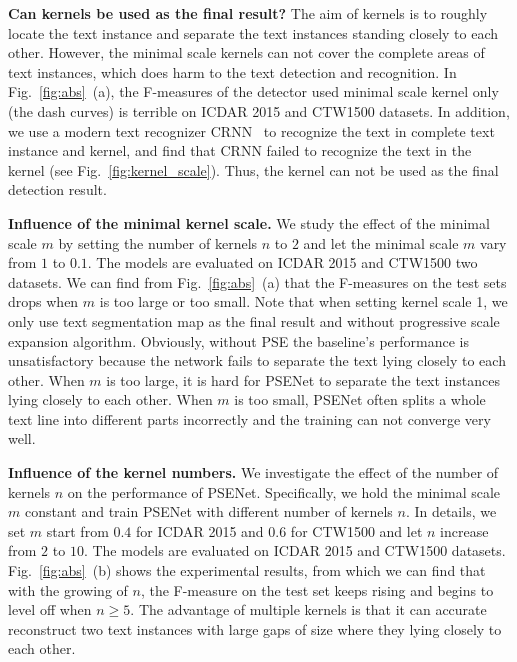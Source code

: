 \documentclass[10pt,twocolumn,letterpaper]{article}
\begin{document}
	\textbf{Can kernels be used as the final result?} The aim of kernels is to roughly locate the text instance and separate the text instances standing closely to each other. However, the minimal scale kernels can not cover the complete areas of text instances, which does harm to the text detection and recognition. In Fig.~\ref{fig:abs}~(a), the F-measures of the detector used minimal scale kernel only (the dash curves) is terrible on ICDAR 2015 and CTW1500 datasets. In addition, we use a modern text recognizer CRNN~\cite{crnn} to recognize the text in complete text instance and kernel, and find that CRNN failed to recognize the text in the kernel (see Fig.~\ref{fig:kernel_scale}). Thus, the kernel can not be used as the final detection result.
	
	\textbf{Influence of the minimal kernel scale.} We study the effect of the minimal scale $m$ by setting the number of kernels $n$ to $2$ and let the minimal scale $m$ vary from $1$ to $0.1$. The models are evaluated on ICDAR 2015 and CTW1500 two datasets. We can find from Fig.~\ref{fig:abs}~(a) that the F-measures on the test sets drops when $m$ is too large or too small. 
	Note that when setting kernel scale 1, we only use text segmentation map as the final result and without progressive scale expansion algorithm. Obviously, without PSE the baseline's performance is unsatisfactory because the network fails to separate the text lying closely to each other.
	When $m$ is too large, it is hard for PSENet to separate the text instances lying closely to each other. When $m$ is too small, PSENet often splits a whole text line into different parts incorrectly and the training can not converge very well.
	
	\textbf{Influence of the kernel numbers.} We investigate the effect of the number of kernels $n$ on the performance of PSENet. Specifically, we hold the minimal scale $m$ constant and train PSENet with different number of kernels $n$. In details, we set $m$ start from $0.4$ for ICDAR 2015 and $0.6$ for CTW1500 and let $n$ increase from $2$ to $10$. The models are evaluated on ICDAR 2015 and CTW1500 datasets. Fig.~\ref{fig:abs}~(b) shows the experimental results, from which we can find that with the growing of $n$, the F-measure on the test set keeps rising and begins to level off when $n \ge 5$. 
	The advantage of multiple kernels is that it can accurate reconstruct two text instances with large gaps of size where they lying closely to each other.
	
\end{document}
